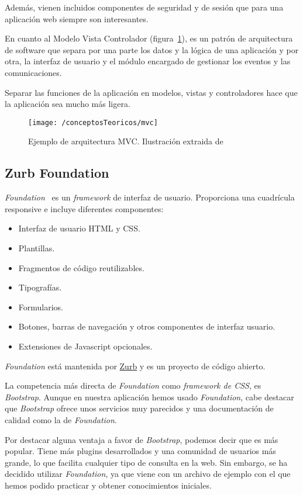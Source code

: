 Además, vienen incluidos componentes de seguridad y de sesión que para una aplicación web siempre son interesantes.

En cuanto al Modelo Vista Controlador (figura~\ref{fig:mvc}), es un patrón de arquitectura de software que separa por una parte los datos y la lógica de una aplicación y por otra, la interfaz de usuario y el módulo encargado de gestionar los eventos y las comunicaciones. 

Separar las funciones de la aplicación en modelos, vistas y controladores hace que la aplicación sea mucho más ligera.

\begin{figure}[ht]
	\centering
	\texttt{[image: /conceptosTeoricos/mvc]}
	\caption{Ejemplo de arquitectura MVC. Ilustración extraida de~\cite{img:MVC}}
	\label{fig:mvc}
\end{figure}

\subsection{Zurb Foundation}

\textit{Foundation}~\cite{web:foundation} es un \textit{framework} de interfaz de usuario. Proporciona una cuadrícula responsive e incluye diferentes componentes:
\begin{itemize}
	\item Interfaz de usuario HTML y CSS.
	\item Plantillas.
	\item Fragmentos de código reutilizables.
	\item Tipografías.
	\item Formularios.
	\item Botones, barras de navegación y otros componentes de interfaz usuario.
	\item Extensiones de Javascript opcionales.
\end{itemize}

\textit{Foundation} está mantenida por \href{zurb.com}{Zurb} y es un proyecto de código abierto.

La competencia más directa de \textit{Foundation} como \textit{framework de CSS}, es \textit{Bootstrap}. Aunque en nuestra aplicación hemos usado \textit{Foundation}, cabe destacar que \textit{Bootstrap} ofrece unos servicios muy parecidos y una documentación de calidad como la de \textit{Foundation}. 

Por destacar alguna ventaja a favor de \textit{Bootstrap}, podemos decir que es más popular. Tiene más plugins desarrollados y una comunidad de usuarios más grande, lo que facilita cualquier tipo de consulta en la web. Sin embargo, se ha decidido utilizar \textit{Foundation}, ya que viene con un archivo de ejemplo con el que hemos podido practicar y obtener conocimientos iniciales.
